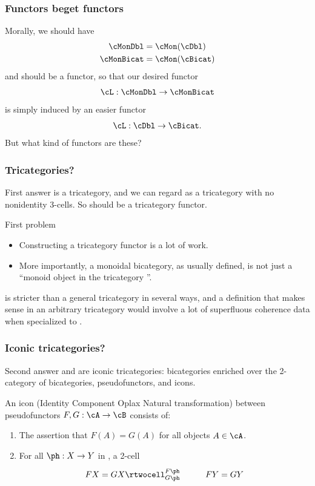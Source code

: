 \documentclass{beamer}
\begin{document}
\begin{frame}
  \frametitle{Functors beget functors}
  Morally, we should have
  \begin{align*}
    \cMonDbl &= \cMon(\cDbl) \\
    \cMonBicat &= \cMon(\cBicat)
  \end{align*}
  and \cMon should be a functor, so that our desired functor
  \[\cL : \cMonDbl \to \cMonBicat \]
  is simply induced by an easier functor
  \[ \cL : \cDbl \to \cBicat. \]
  But \alert{what kind of functors are these?}
\end{frame}

\begin{frame}
  \frametitle{Tricategories?}
  \begin{block}{First answer}
    \cBicat is a \alert{tricategory}, and we can regard \cDbl as a tricategory with no nonidentity 3-cells.
    So \cL should be a tricategory functor.
  \end{block}
  \begin{block}{First problem}
    \begin{itemize}
    \item Constructing a tricategory functor is a lot of work.
    \item More importantly, a monoidal bicategory, as usually defined, is \alert{not} just a ``monoid object in the tricategory \cBicat''.
    \end{itemize}
  \end{block}
  \cBicat is stricter than a general tricategory in several ways, and a definition that makes sense in an arbitrary tricategory would involve a lot of superfluous coherence data when specialized to \cBicat.
\end{frame}

\begin{frame}
  \frametitle{Iconic tricategories?}
  \begin{block}{Second answer}
    \cBicat and \cDbl are \alert{iconic tricategories}: bicategories enriched over the 2-category of bicategories, pseudofunctors, and \alert{icons}.
  \end{block}
  \begin{definition}[Lack 2010]
    An \alert{icon} (\alert{I}dentity \alert{C}omponent \alert{O}plax \alert{N}atural transformation) between pseudofunctors $F,G:\cA\to\cB$ consists of:
    \begin{enumerate}
    \item The assertion that $F(A) = G(A)$ for all objects $A\in\cA$.
    \item For all $\ph:X\to Y$ in \cA, a 2-cell
      \[ \xymatrix{ \mathllap{FX =\;} GX \rtwocell^{F\ph}_{G\ph} & FY \mathrlap{\;= GY} } \]
    \end{enumerate}
  \end{definition}
\end{frame}
\end{document}
